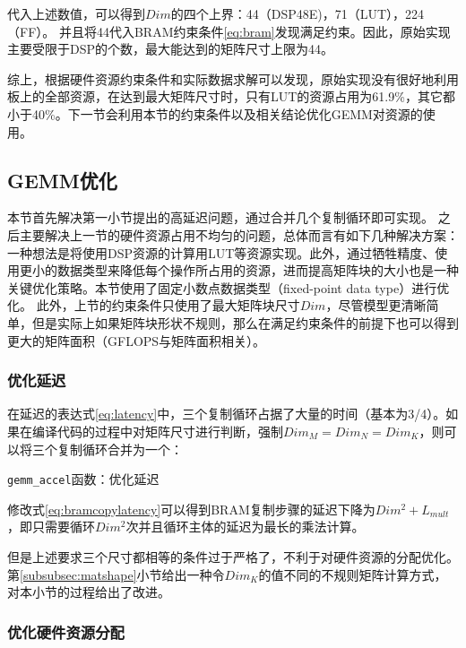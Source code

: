 代入上述数值，可以得到\(Dim\)的四个上界：44（DSP48E)，71（LUT），224（FF）。
并且将44代入BRAM约束条件\ref{eq:bram}发现满足约束。因此，原始实现主要受限于DSP的个数，最大能达到的矩阵尺寸上限为44。

综上，根据硬件资源约束条件和实际数据求解可以发现，原始实现没有很好地利用板上的全部资源，在达到最大矩阵尺寸时，只有LUT的资源占用为61.9\%，其它都小于40\%。下一节会利用本节的约束条件以及相关结论优化GEMM对资源的使用。

\subsection{GEMM优化}\label{subsec:gemmopt}

本节首先解决第一小节提出的高延迟问题，通过合并几个复制循环即可实现。
之后主要解决上一节的硬件资源占用不均匀的问题，总体而言有如下几种解决方案：一种想法是将使用DSP资源的计算用LUT等资源实现。此外，通过牺牲精度、使用更小的数据类型来降低每个操作所占用的资源，进而提高矩阵块的大小也是一种关键优化策略。本节使用了固定小数点数据类型（fixed-point data type）进行优化。
此外，上节的约束条件只使用了最大矩阵块尺寸\(\mathit{Dim}\)，尽管模型更清晰简单，但是实际上如果矩阵块形状不规则，那么在满足约束条件的前提下也可以得到更大的矩阵面积（GFLOPS与矩阵面积相关）。

\subsubsection{优化延迟}\label{subsubsec:latency}
在延迟的表达式\ref{eq:latency}中，三个复制循环占据了大量的时间（基本为3/4）。如果在编译代码的过程中对矩阵尺寸进行判断，强制$Dim_M=Dim_N=Dim_K$，则可以将三个复制循环合并为一个：
\begin{listing}[!ht]
	
	\caption{\texttt{gemm\_accel}函数：优化延迟}
	\label{lst:gemmcopy}
\end{listing}

修改式\ref{eq:bramcopylatency}可以得到BRAM复制步骤的延迟下降为$Dim ^ 2 + L_{mult}$，即只需要循环$Dim^2$次并且循环主体的延迟为最长的乘法计算。

但是上述要求三个尺寸都相等的条件过于严格了，不利于对硬件资源的分配优化。第\ref{subsubsec:matshape}小节给出一种令$Dim_K$的值不同的不规则矩阵计算方式，对本小节的过程给出了改进。

\subsubsection{优化硬件资源分配}\label{subsubsec:resalloc}


